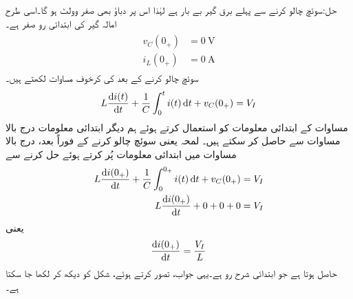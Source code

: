 حل:سوئچ چالو کرنے سے پہلے برق گیر بے بار ہے لہٰذا اس پر دباؤ بھی صفر وولٹ ہو گا۔اسی طرح امالہ گیر کی ابتدائی رو صفر ہے۔
\begin{gather}
\begin{aligned}\label{مساوات_عارضی_ابتدائی_معلومات_امالہ_برق_گیر_الف}
v_C(0_+)&=\SI{0}{\volt}\\
i_L(0_+)&=\SI{0}{\ampere}
\end{aligned}
\end{gather}
سوئچ چالو کرنے کے بعد کی کرخوف مساوات لکھتے ہیں۔
\begin{align}\label{مساوات_عارضی_امالہ_برق_گیر_الف}
L\frac{\dif i(t)}{\dif t}+\frac{1}{C}\int_{0}^{t} i(t)\dif t+v_C(0_+)=V_I
\end{align}
مساوات  کے ابتدائی معلومات کو استعمال کرتے ہوئے ہم دیگر ابتدائی معلومات درج بالا مساوات سے حاصل کر سکتے ہیں۔ لمحہ  یعنی سوئچ چالو کرنے کے فوراً بعد، درج بالا مساوات میں ابتدائی معلومات پُر کرتے ہوئے  حل کرنے سے
\begin{align*}
L\frac{\dif i(0_+)}{\dif t}+\frac{1}{C}\int_{0}^{0_+} i(t)\dif t+v_C(0_+)&=V_I\\
L\frac{\dif i(0_+)}{\dif t}+0+0+0&=V_I
\end{align*}
یعنی
\begin{align}
\frac{\dif i(0_+)}{\dif t}=\frac{V_I}{L}
\end{align}
حاصل ہوتا ہے جو ابتدائی شرح رو ہے۔یہی جواب،  تصور کرتے ہوئے، شکل  کو دیکھ کر لکھا جا سکتا ہے۔

